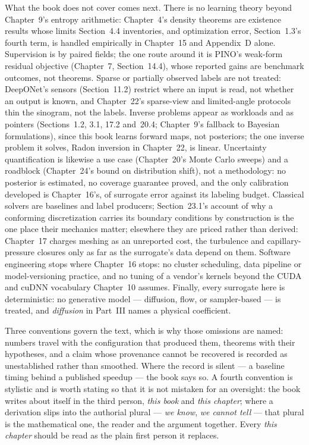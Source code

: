 What the book does not cover comes next. There is no learning theory beyond
Chapter~9's entropy arithmetic: Chapter~4's density theorems are existence results whose limits
Section~4.4 inventories, and optimization error, Section~1.3's fourth term, is
handled empirically in Chapter~15 and Appendix~D alone. Supervision is by paired fields; the one
route around it is PINO's weak-form residual objective (Chapter~7, Section~14.4), whose reported
gains are benchmark outcomes, not theorems. Sparse or partially observed labels are not treated:
DeepONet's sensors (Section~11.2) restrict where an input is read, not whether an output is
known, and Chapter~22's sparse-view and limited-angle protocols thin the sinogram, not the
labels. Inverse problems appear as workloads and as pointers (Sections~1.2, 3.1, 17.2 and~20.4;
Chapter~9's fallback to Bayesian formulations), since this book learns forward maps, not
posteriors; the one inverse problem it solves, Radon inversion in Chapter~22, is linear.
Uncertainty quantification is likewise a use case (Chapter~20's Monte Carlo sweeps) and a
roadblock (Chapter~24's bound on distribution shift), not a methodology: no posterior is
estimated, no coverage guarantee proved, and the only calibration developed is
Chapter~16's, of surrogate error against its labeling budget. Classical solvers
are baselines and label producers; Section~23.1's account of why a conforming
discretization carries its boundary conditions by construction is the one place their mechanics
matter; elsewhere they are priced rather than derived: Chapter~17 charges meshing as an
unreported cost, the turbulence and capillary-pressure closures only as far as the surrogate's
data depend on them. Software engineering stops where Chapter~16 stops: no cluster scheduling,
data pipeline or model-versioning practice, and no tuning of a vendor's kernels beyond the CUDA
and cuDNN vocabulary Chapter~10 assumes. Finally, every surrogate here is deterministic: no
generative model --- diffusion, flow, or sampler-based --- is treated, and \emph{diffusion} in
Part~III names a physical coefficient.

Three conventions govern the text, which is why those omissions are named: numbers travel with
the configuration that produced them, theorems with their hypotheses, and a claim whose
provenance cannot be recovered is recorded as unestablished rather than smoothed. Where the
record is silent --- a baseline timing behind a published speedup --- the book says so. A
fourth convention is stylistic and is worth stating so that it is not mistaken for an
oversight: the book writes about itself in the third person, \emph{this book} and
\emph{this chapter}; where a derivation slips into the authorial plural --- \emph{we
know}, \emph{we cannot tell} --- that plural is the mathematical one, the reader and
the argument together. Every \emph{this chapter}
should be read as the plain first person it replaces.
